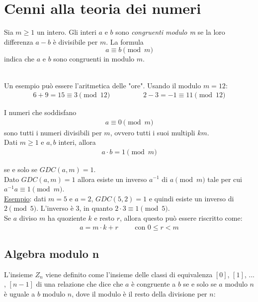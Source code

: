 \chapter{Cenni alla teoria dei numeri}
\label{chapter3}

\begin{definition}
Sia \(m \ge 1\) un intero. Gli interi \(a\) e \(b\) sono \textit{congruenti modulo m} se la loro differenza \(a-b\) è divisibile per \(m\). La formula 
\[a \equiv b \pmod m\]
indica che \(a\) e \(b\) sono congruenti in modulo \(m\).
\end{definition}

\noindent\\ Un esempio può essere l'aritmetica delle "ore". Usando il modulo $m = 12$:
\begin{align*}
    6+9=15 \equiv 3 \pmod{12} \hspace{2cm} 2-3=-1 \equiv 11 \pmod{12}
\end{align*}

\noindent I numeri che soddisfano 
\begin{align*}
    a \equiv 0 \pmod m
\end{align*}
\noindent sono tutti i numeri divisibili per $m$, ovvero tutti i suoi multipli $km$.\\

\noindent Dati $m \ge 1$ e $a, b$ interi, allora
\begin{align*}
    a \cdot b = 1 \pmod m
\end{align*}

\noindent se e solo se $GDC(a, m) = 1$.\\

\noindent Dato $GDC(a, m) = 1$ allora esiste un inverso $a^{-1}$ di $a \pmod m$ tale per cui $a^{-1}a \equiv 1 \pmod m$. \\

\noindent \underline{Esempio}: dati $m = 5$ e $a = 2$, $GDC(5, 2) = 1$ e quindi esiste un inverso di $2 \pmod 5$. L'inverso è $3$, in quanto $2\cdot 3 \equiv 1 \pmod 5$.
\\

\noindent Se $a$ diviso $m$ ha quoziente $k$ e resto $r$, allora questo può essere riscritto come:
\begin{align*}
    a = m \cdot k + r \hspace{1cm} \text{con } 0 \le r < m
\end{align*}

\section{Algebra modulo n}
L'insieme $Z_n$ viene definito come l'insieme delle classi di equivalenza $[0]$, $[1]$, $...$, $[n-1]$ di una relazione che dice che ${a}$ è congruente a ${b}$ se e solo se ${a}$ modulo $n$ è uguale a ${b}$ modulo ${n}$, dove il modulo è il resto della divisione per ${n}$:

